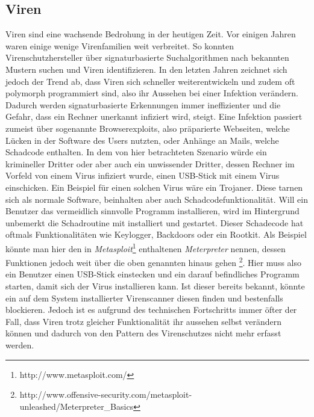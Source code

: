 \subsection{Viren}
Viren sind eine wachsende Bedrohung in der heutigen Zeit. Vor einigen Jahren waren einige wenige Virenfamilien weit verbreitet. So konnten Virenschutzhersteller über signaturbasierte Suchalgorithmen nach bekannten Mustern suchen und Viren identifizieren. In den letzten Jahren zeichnet sich jedoch der Trend ab, dass Viren sich schneller weiterentwickeln und zudem oft polymorph programmiert sind, also ihr Aussehen bei einer Infektion verändern. Dadurch werden signaturbasierte Erkennungen immer ineffizienter und die Gefahr, dass ein Rechner unerkannt infiziert wird, steigt. Eine Infektion passiert zumeist über sogenannte Browserexploits, also präparierte Webseiten, welche Lücken in der Software des Users nutzten, oder Anhänge an Mails, welche Schadcode enthalten. In dem von hier betrachteten Szenario würde ein krimineller Dritter oder aber auch ein unwissender Dritter, dessen Rechner im Vorfeld von einem Virus infiziert wurde, einen USB-Stick mit einem Virus einschicken. Ein Beispiel für einen solchen Virus wäre ein Trojaner. Diese tarnen sich als normale Software, beinhalten aber auch Schadcodefunktionalität. \cite{Stamp2006} Will ein Benutzer das vermeidlich sinnvolle Programm installieren, wird im Hintergrund unbemerkt die Schadroutine mit installiert und gestartet. Dieser Schadecode hat oftmals Funktionalitäten wie Keylogger, Backdoors oder ein Rootkit. Als Beispiel könnte man hier den in \textit{Metasploit}\footnote{http://www.metasploit.com/} enthaltenen \textit{Meterpreter} nennen, dessen Funktionen jedoch weit über die oben genannten hinaus gehen \footnote{http://www.offensive-security.com/metasploit-unleashed/Meterpreter\_Basics}. Hier muss also ein Benutzer einen USB-Stick einstecken und ein darauf befindliches Programm starten, damit sich der Virus installieren kann. Ist dieser bereits bekannt, könnte ein auf dem System installierter Virenscanner diesen finden und bestenfalls blockieren. Jedoch ist es aufgrund des technischen Fortschritts immer öfter der Fall, dass Viren trotz gleicher Funktionalität ihr aussehen selbst verändern können und dadurch von den Pattern des Virenschutzes nicht mehr erfasst werden.
			
